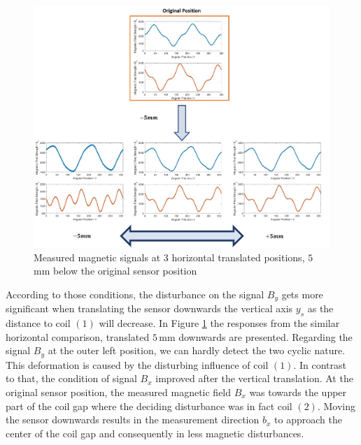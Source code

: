 \documentclass[english]{isasthesis}
\begin{document}
    		\begin{figure}[t]
    		\begin{center}
    			\includegraphics[width=1\textwidth]{figures/Positions/original_translated_vertical_2.jpg}   
  			\end{center}
    		\caption{Measured magnetic signals at 3 horizontal translated positions, $5\,$mm below the original sensor position}
    		\label{fig:position original translated downwards}
    		\end{figure}
    	According to those conditions, the disturbance on the signal $B_y$ gets more significant when translating the sensor downwards the vertical axis $y_s$ as the distance to coil $(1)$ will decrease. In Figure \ref{fig:position original translated downwards} the responses from the similar horizontal comparison, translated $5\,$mm downwards are presented. Regarding the signal $B_y$ at the outer left position, we can hardly detect the two cyclic nature. This deformation is caused by the disturbing influence of coil $(1)$. In contrast to that, the condition of signal $B_x$ improved after the vertical translation. At the original sensor position, the measured magnetic field $B_x$ was towards the upper part of the coil gap where the deciding disturbance was in fact coil $(2)$. Moving the sensor downwards results in the measurement direction $b_x$ to approach the center of the coil gap and consequently in less magnetic disturbances.
\end{document}
